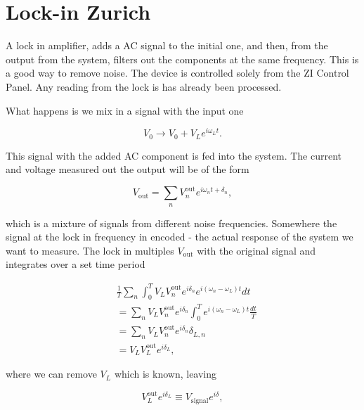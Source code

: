 \section{Lock-in Zurich}
A lock in amplifier,  adds a AC signal to the  initial one, and then,
from the  output from the system,  filters out the components  at the
same frequency.  This is a  good way to  remove noise. The  device is
controlled solely  from the  ZI Control Panel.  Any reading  from the
lock is has already been processed.

What happens is we mix in a signal with the input one

  \begin{equation}
    V_0 \rightarrow V_0+V_{L}e^{i\omega_{L}t}.
  \end{equation}

  \noindent This signal  with the added AC component is  fed into the
  system. The current and voltage measured  out the output will be of
  the form

  \begin{equation}
    V_{\text{out}} = \sum_{n}V_n^{\text{out}}e^{i\omega_n t+\delta_n},
  \end{equation}

  \noindent  which  is a  mixture  of  signals from  different  noise
  frequencies.  Somewhere the  signal  at the  lock  in frequency  in
  encoded - the actual response of the system we want to measure. The
  lock in multiples  $ V_{\text{out}} $ with the  original signal and
  integrates over a set time period

  \begin{equation}
    \begin{aligned}
      &                                             \frac{1}{T}\sum_n
      \int_{0}^{T}V_{L}V^{\text{out}}_ne^{i\delta_n}e^{i(\omega_n   -
        \omega_{L})t}dt            \\&            =            \sum_n
      V_{L}V^{\text{out}}_ne^{i\delta_{n}}\int_{0}^{T}e^{i(\omega_n -
        \omega_{L})t}\frac{dt}{T}         \\&        =         \sum_n
      V_{L}V^{\text{out}}_ne^{i\delta_{n}}\delta_{L,n}      \\&     =
      V_{L}V^{\text{out}}_Le^{i\delta_L},
    \end{aligned}
  \end{equation}

  \noindent where we can remove $ V_L $ which is known, leaving

  \begin{equation}
    V_{L}^{\text{out}}e^{i\delta_L} \equiv V_{\text{signal}}e^{i\delta},
  \end{equation}

